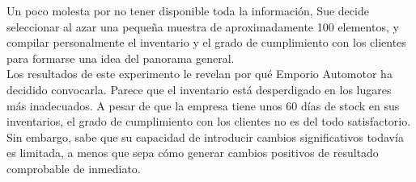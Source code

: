 \documentclass[a4paper,10pt,titlepage]{article}
\begin{document}
Un poco molesta por no tener disponible toda la informaci\'on, Sue decide seleccionar al azar una pequeña muestra de aproximadamente 100 elementos, y compilar 
personalmente el inventario y el grado de cumplimiento con los clientes para formarse una idea del panorama general.\\

Los resultados de este experimento le revelan por qu\'e Emporio Automotor ha decidido convocarla. Parece que el inventario est\'a desperdigado en los lugares m\'as 
inadecuados. A pesar de que la empresa tiene unos 60 d\'ias de stock en sus inventarios, el grado de cumplimiento con los clientes no es del todo satisfactorio. \\

Sin embargo, sabe que su capacidad de introducir cambios significativos todav\'ia es limitada, a menos que sepa c\'omo generar cambios positivos de resultado 
comprobable de inmediato.\\

\newpage
\end{document}
